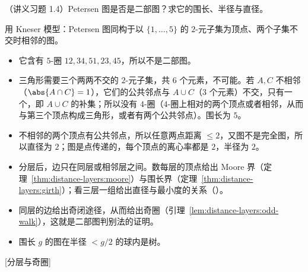 \begin{workedexample}\label{we:distance-layers:petersen}
（讲义习题 1.4）Petersen 图是否是二部图？求它的围长、半径与直径。
\end{workedexample}
\begin{solution}
用 Kneser 模型：Petersen 图同构于以 $\{1,\dots,5\}$ 的 $2$-元子集为顶点、两个子集不交时相邻的图。
\begin{itemize}
\item 它含有 $5$-圈 $12,34,51,23,45$，所以不是二部图。
\item 三角形需要三个两两不交的 $2$-元子集，共 $6$ 个元素，不可能。若 $A,C$ 不相邻（$\abs{A\cap C}=1$），它们的公共邻点与 $A\cup C$（$3$ 个元素）不交，只有一个，即 $A\cup C$ 的补集；所以没有 $4$-圈（$4$-圈上相对的两个顶点或者相邻，从而与第三个顶点构成三角形，或者有两个公共邻点）。围长为 $5$。
\item 不相邻的两个顶点有公共邻点，所以任意两点距离 $\leqslant2$，又图不是完全图，所以直径为 $2$；图是点传递的，每个顶点的离心率都是 $2$，半径为 $2$。
\end{itemize}
\end{solution}


\begin{itemize}
\item 分层后，边只在同层或相邻层之间。数每层的顶点给出 Moore 界（定理~\ref{thm:distance-layers:moore}）与围长界（定理~\ref{thm:distance-layers:girth}）；看三层一组给出直径与最小度的关系（）。
\item 同层的边给出奇闭途径，从而给出奇圈（引理~\ref{lem:distance-layers:odd-walk}），这就是二部图判别法的证明。
\item 围长 $g$ 的图在半径 $<g/2$ 的球内是树。
\end{itemize}

[分层与奇圈]


